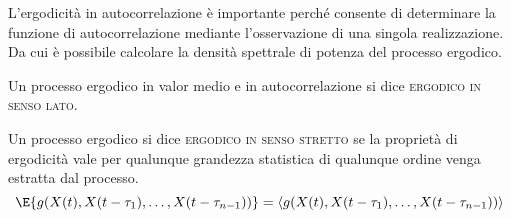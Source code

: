 L'ergodicità in autocorrelazione è importante perché consente di determinare la funzione di autocorrelazione mediante l'osservazione di una singola realizzazione. Da cui è possibile calcolare la densità spettrale di potenza del processo ergodico.

\begin{definizione}
Un processo ergodico in valor medio e in autocorrelazione si dice \textsc{ergodico in senso lato}.
\end{definizione}

\begin{definizione}
Un processo ergodico si dice \textsc{ergodico in senso stretto} se la proprietà di ergodicità vale per qualunque grandezza statistica di qualunque ordine venga estratta dal processo.
\[
	\E{g(X(t),X(t-\tau_1),\dots,X(t-\tau_{n-1}))}=\langle g(X(t),X(t-\tau_1),\dots,X(t-\tau_{n-1}))\rangle
\]
\end{definizione}

